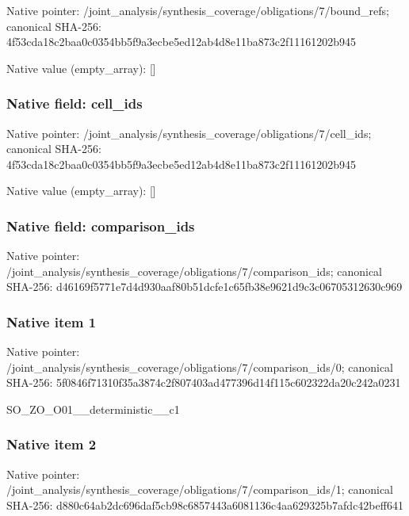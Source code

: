 \documentclass[10pt,a4paper]{article}
\begin{document}
Native pointer: /joint\_analysis/synthesi\allowbreak{}s\_coverage/obligations/7\allowbreak{}/bound\_refs; canonical SHA-256: 4f53cda18c2baa0c0354bb5f\allowbreak{}9a3ecbe5ed12ab4d8e11ba87\allowbreak{}3c2f11161202b945



Native value (empty\_array): []



\subsubsection{Native field: cell\_ids}


Native pointer: /joint\_analysis/synthesi\allowbreak{}s\_coverage/obligations/7\allowbreak{}/cell\_ids; canonical SHA-256: 4f53cda18c2baa0c0354bb5f\allowbreak{}9a3ecbe5ed12ab4d8e11ba87\allowbreak{}3c2f11161202b945



Native value (empty\_array): []



\subsubsection{Native field: comparison\_ids}


Native pointer: /joint\_analysis/synthesi\allowbreak{}s\_coverage/obligations/7\allowbreak{}/comparison\_ids; canonical SHA-256: d46169f5771e7d4d930aaf80\allowbreak{}b51dcfe1c65fb38e9621d9c3\allowbreak{}c06705312630c969



\subsubsection{Native item 1}


Native pointer: /joint\_analysis/synthesi\allowbreak{}s\_coverage/obligations/7\allowbreak{}/comparison\_ids/0; canonical SHA-256: 5f0846f71310f35a3874c2f8\allowbreak{}07403ad477396d14f115c602\allowbreak{}322da20c242a0231


SO\_ZO\_O01\_\_deterministic\_\_c1


\subsubsection{Native item 2}


Native pointer: /joint\_analysis/synthesi\allowbreak{}s\_coverage/obligations/7\allowbreak{}/comparison\_ids/1; canonical SHA-256: d880c64ab2dc696daf5cb98c\allowbreak{}6857443a6081136c4aa62932\allowbreak{}5b7afdc42beff641
\end{document}

